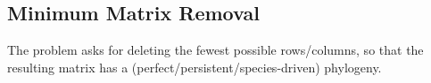 \subsection{Minimum Matrix Removal}

The problem asks for deleting the fewest possible rows/columns, so that the resulting matrix has a (perfect/persistent/species-driven) phylogeny.
